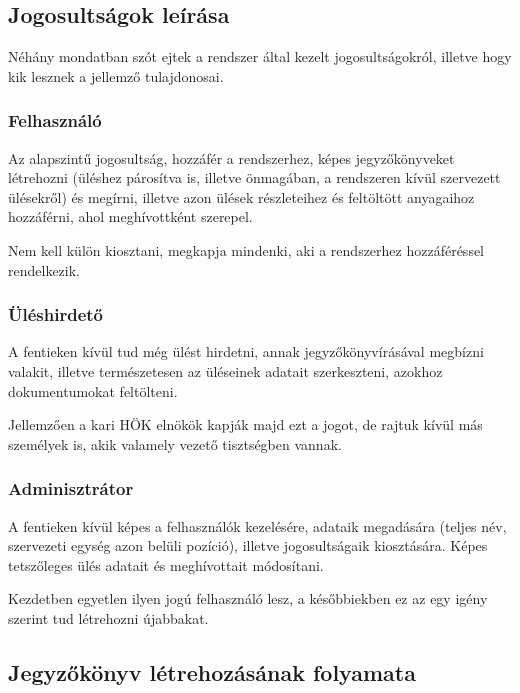 \documentclass[a4paper,12pt,oneside]{report}
\begin{document}
\subsection{Jogosultságok leírása}

Néhány mondatban szót ejtek a rendszer által kezelt jogosultságokról, illetve hogy kik lesznek a jellemző tulajdonosai.

\subsubsection*{Felhasználó}

Az alapszintű jogosultság, hozzáfér a rendszerhez, képes jegyzőkönyveket létrehozni (üléshez párosítva is, illetve önmagában, a rendszeren kívül szervezett ülésekről) és megírni, illetve azon ülések részleteihez és feltöltött anyagaihoz hozzáférni, ahol meghívottként szerepel.

Nem kell külön kiosztani, megkapja mindenki, aki a rendszerhez hozzáféréssel rendelkezik.

\subsubsection*{Üléshirdető}

A fentieken kívül tud még ülést hirdetni, annak jegyzőkönyvírásával megbízni valakit, illetve természetesen az üléseinek adatait szerkeszteni, azokhoz dokumentumokat feltölteni.

Jellemzően a kari HÖK elnökök kapják majd ezt a jogot, de rajtuk kívül más személyek is, akik valamely vezető tisztségben vannak.

\subsubsection*{Adminisztrátor}

A fentieken kívül képes a felhasználók kezelésére, adataik megadására (teljes név, szervezeti egység azon belüli pozíció), illetve jogosultságaik kiosztására. Képes tetszőleges ülés adatait és meghívottait módosítani.

Kezdetben egyetlen ilyen jogú felhasználó lesz, a későbbiekben ez az egy igény szerint tud létrehozni újabbakat.

\subsection{Jegyzőkönyv létrehozásának folyamata}
\end{document}
